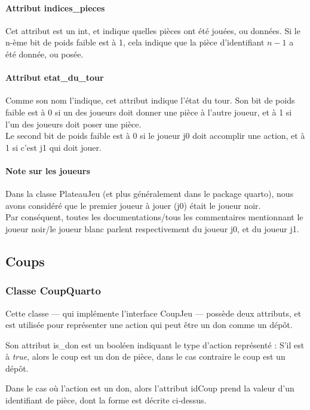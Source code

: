 \documentclass{article}
\begin{document}
\paragraph{Attribut indices\_pieces}
Cet attribut est un int, et indique quelles pièces ont été jouées, ou données.
Si le n-ème bit de poids faible est à 1, cela indique que la pièce
d'identifiant \(n-1\) a été donnée, ou posée.

\paragraph{Attribut etat\_du\_tour}
Comme son nom l'indique, cet attribut indique l'état du tour.
Son bit de poids faible est à 0 si un des joueurs doit donner une
pièce à l'autre joueur, et à 1 si l'un des joueurs doit poser une
pièce.\\
Le second bit de poids faible est à 0 si le joueur j0 doit accomplir
une action, et à 1 si c'est j1 qui doit jouer.


\paragraph{Note sur les joueurs}
Dans la classe PlateauJeu (et plus généralement dans le package
quarto), nous avons considéré que le premier joueur à jouer (j0) était
le joueur noir. \\
Par conséquent, toutes les documentations/tous les
commentaires mentionnant le joueur noir/le joueur blanc parlent
respectivement du joueur j0, et du joueur j1.



\subsection{Coups}
\subsubsection{Classe CoupQuarto}
Cette classe --- qui implémente l'interface CoupJeu ---
possède deux attributs, et est utilisée pour représenter
une action qui peut être un don comme un dépôt.

Son attribut is\_don est un booléen indiquant le type d'action
représenté : S'il est à \emph{true}, alors le coup est un don de
pièce, dans le cas contraire le coup est un dépôt.

Dans le cas o\`u l'action est un don, alors l'attribut idCoup prend la 
valeur d'un identifiant de pièce, dont la forme est décrite
ci-dessus. 
\end{document}

